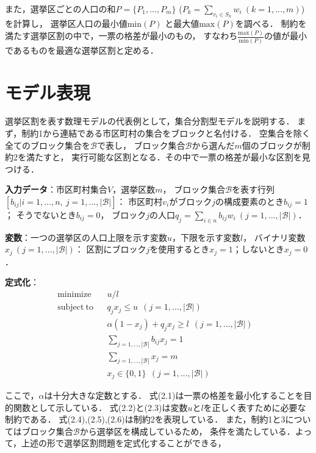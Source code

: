 また，選挙区ごとの人口の和$P=\{P_1,...,P_m\}$ ($P_k=\sum_{v_i\in S_k}w_i\ (k=1,...,m)$)を計算し，
選挙区人口の最小値$\mathrm{min}(P)$ と最大値$\mathrm{max}(P)$を調べる．
制約を満たす選挙区割の中で，一票の格差が最小のもの，
すなわち$\frac{\mathrm{max}(P)}{\mathrm{min}(P)}$の値が最小であるものを最適な選挙区割と定める．


\section{モデル表現}
選挙区割を表す数理モデルの代表例として，集合分割型モデルを説明する．
まず，制約1から連結である市区町村の集合をブロックと名付ける．
空集合を除く全てのブロック集合を$\mathscr{B}$で表し，
ブロック集合$\mathscr{B}$から選んだ$m$個のブロックが制約2を満たすと，
実行可能な区割となる．その中で一票の格差が最小な区割を見つける．

\textbf{入力データ}：市区町村集合$V$，選挙区数$m$，
ブロック集合$\mathscr{B}$を表す行列$[b_{ij}|i=1,...,n,~j=1,...,|\mathscr{B}|]$：
市区町村$v_i$がブロック$j$の構成要素のとき$b_{ij}=1$；
そうでないとき$b_{ij}=0$，
ブロック$j$の人口$q_j=\sum_{i\in n}b_{ij}w_{i}~(j=1,...,|\mathscr{B}|)$．

\textbf{変数}：一つの選挙区の人口上限を示す変数$u$，下限を示す変数$l$，
バイナリ変数$x_j~(j=1,...,|\mathscr{B}|)$：
区割にブロック$j$を使用するとき$x_j=1$；しないとき$x_j=0$．

\textbf{定式化}：
\begin{align}
    &\mathrm{minimize} && u/l && \\
    &\mathrm{subject~to} && q_jx_j\leq u~~(j=1,...,|\mathscr{B}|) && \\
    & && \alpha(1-x_j)+q_jx_j\geq l~~(j=1,...,|\mathscr{B}|) && \\
    & && \sum_{j=1,...,|\mathscr{B}|}b_{ij}x_{j}=1 && \\
    & && \sum_{j=1,...,|\mathscr{B}|}x_j=m && \\
    & && x_j \in \{0,1\}~~(j=1,...,|\mathscr{B}|) &&
\end{align}

ここで，$\alpha$は十分大きな定数とする．
式(2.1)は一票の格差を最小化することを目的関数として示している．
式(2.2)と(2.3)は変数$u$と$l$を正しく表すために必要な制約である．
式(2.4),(2.5),(2.6)は制約2を表現している．
また，制約1と3についてはブロック集合$\mathscr{B}$から選挙区を構成しているため，
条件を満たしている．よって，上述の形で選挙区割問題を定式化することができる，